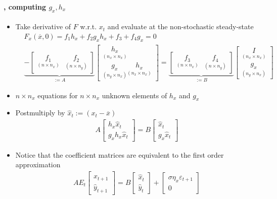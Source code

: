 \documentclass[10pt]{beamer}  %
\begin{document}
\begin{frame}
\frametitle{\secname}\framesubtitle{\subsecname, computing $g_x,h_x$}\footnotesize
\begin{itemize}
  \item Take derivative of $F$ w.r.t. $x_t$ and evaluate at the non-stochastic steady-state
  \begin{eqnarray*}
&    F_x (\overline{x},0) = f_1 h_x + f_2 g_x h_x + f_3 + f_4 g_x = 0\\
& \underbrace{- \begin{bmatrix} \underset{(n\times n_x)}{f_1} & \underset{(n\times n_y)}{f_2} \end{bmatrix}}_{:=A} \begin{bmatrix} \underset{(n_x\times n_x)}{h_x} \\ \underset{(n_y\times n_x)}{g_x} \underset{(n_x\times n_x)}{h_x} \end{bmatrix}  = \underbrace{\begin{bmatrix} \underset{(n\times n_x)}{f_3} & \underset{(n\times n_y)}{f_4}\end{bmatrix}}_{:=B} \begin{bmatrix} \underset{(n_x\times n_x)}{I} \\\underset{(n_y\times n_x)}{g_x} \end{bmatrix}
  \end{eqnarray*}
  \item $n\times n_x$ equations for $n\times n_x$ unknown elements of $h_x$ and $g_x$
  \item Postmultiply by $\widehat{x}_t := (x_t-\overline{x})$
  \begin{align*}
    A \begin{bmatrix} h_x \widehat{x}_t \\ g_x h_x \widehat{x}_t \end{bmatrix} = B \begin{bmatrix} \widehat{x}_t \\ g_x \widehat{x}_t \end{bmatrix}
  \end{align*}
  \item Notice that the coefficient matrices are equivalent to the first order approximation
  \begin{eqnarray*}
    AE_t\begin{bmatrix} \widehat{x}_{t+1} \\ \widehat{y}_{t+1} \end{bmatrix} = B\begin{bmatrix} \widehat{x}_t\\ \widehat{y}_t \end{bmatrix} + \begin{bmatrix} \sigma \eta_x \varepsilon_{t+1} \\ 0\end{bmatrix}
  \end{eqnarray*}
\end{itemize}
\end{frame}
\end{document}
